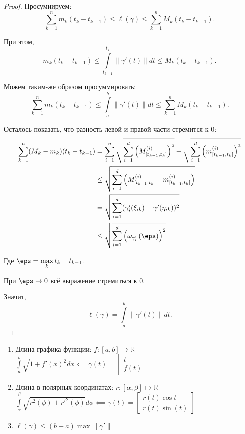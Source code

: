 \begin{theorem}
\begin{proof}
        Просумиируем:
        \[ \sum\limits_{k=1}^{n} m_{k}(t_{k}-t_{k-1}) \le \ell(\gamma) \le \sum\limits_{k=1}^{n} M_{k}(t_{k}-t_{k-1}) .\] 
        
        При этом,
        \[ m_{k}(t_{k}-t_{k-1}) \le \int\limits_{t_{k-1}}^{t_{k}} \|\gamma'(t)\|dt \le M_{k}(t_{k}-t_{k-1})  .\]

        Можем таким-же образом просуммировать:
        \[ \sum\limits_{k=1}^{n} m_{k}(t_{k}-t_{k-1}) \le \int\limits_{a}^{b} \|\gamma'(t)\|dt  \le \sum\limits_{k=1}^{n} M_{k}(t_{k}-t_{k-1}) .\]

        Осталось показать, что разность левой и правой части стремится к $0$:
        \begin{equation*}
            \begin{split}
                \sum\limits_{k=1}^{n} (M_{k}-m_{k})(t_{k}-t_{k-1}) 
                &= \sum\limits_{i=1}^{n} \sqrt{\sum\limits_{i=1}^{d} \left(M_{[t_{k-1}, t_{k}]}^{(i)}\right)^2} - \sqrt{\sum\limits_{i=1}^{d} \left(m_{[t_{k-1}, t_{k}]}^{(i)}\right)^2}\\
                &\le \sqrt{\sum\limits_{i=1}^{d} \left( M_{[t_{k-1}, t_{k}}^{(i)} - m_{[t_{k-1}, t_{k}]}^{(i)} \right) }\\ 
                &= \sqrt{\sum\limits_{i=1}^{d} (\gamma'_{i}(\xi_{ik}) - \gamma'(\eta_{ik}))^2}\\ 
                &\le \sqrt{\sum\limits_{i=1}^{d} \left( \omega_{\gamma_{i}'}\left( \eps \right)  \right)^2 }
            \end{split}
        \end{equation*}
        
        Где $\eps = \max\limits_{k} t_{k} - t_{k-1}$.

        При $\eps \to 0$ всё выражение стремиться к $0$.

        Значит, 
        \[ \ell(\gamma) = \int\limits_{a}^{b} \|\gamma'(t)\|dt  .\] 
    \end{proof}
\end{theorem}
\begin{consequence} \thmslashn

    \begin{enumerate}
        \item Длина графика функции: $f: [a, b] \mapsto \mathbb{R}$ - $\int\limits_{a}^{b} \sqrt{1 + f'(x)^2}dx   \impliedby \gamma(t) = \begin{bmatrix} t \\ f(t) \end{bmatrix} $
        \item Длина в полярных координатах: $r : [\alpha, \beta] \mapsto \mathbb{R}$ - $\int\limits_{\alpha}^{\beta} \sqrt{r^2(\phi) + r'^2(\phi)}d\phi \impliedby \gamma(t) = \begin{bmatrix} r(t)\cos t\\ r(t)\sin(t) \end{bmatrix}   $
        \item $\ell(\gamma) \le (b-a)\max \|\gamma'\|$
    \end{enumerate}
\end{consequence}

